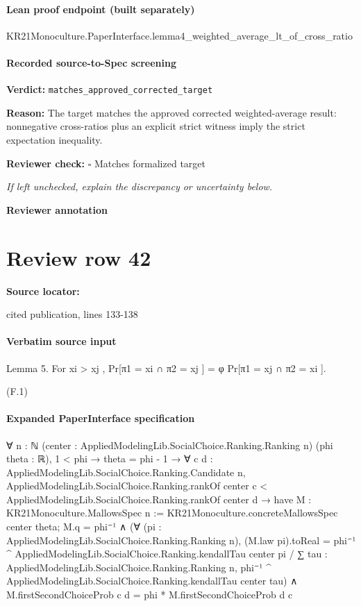 \documentclass[10pt]{article}
\newcommand{\reviewerbox}{%
  \par\noindent\fbox{\parbox{0.96\linewidth}{\rule{0pt}{0.38in}}}\par
}
\newcommand{\reviewmatch}[1]{%
  \par\noindent\textbf{Reviewer check:} $\square$\; #1\par
  \noindent\emph{If left unchecked, explain the discrepancy or uncertainty below.}\par
}
\begin{document}
\paragraph{Lean proof endpoint (built separately)}\begin{ReviewVerbatim}
KR21Monoculture.PaperInterface.lemma4_weighted_average_lt_of_cross_ratio
\end{ReviewVerbatim}

\paragraph{Recorded source-to-Spec screening}
\textbf{Verdict:} \texttt{matches\_approved\_corrected\_target}
\\
{\raggedright
\textbf{Reason:} The target matches the approved corrected weighted-\allowbreak{}average result:\allowbreak{} nonnegative cross-\allowbreak{}ratios plus an explicit strict witness imply the strict expectation inequality.\allowbreak{}
\par}
\reviewmatch{Matches formalized target}
\noindent\textbf{Reviewer annotation}\par
\reviewerbox
\clearpage
\hypertarget{source-claim-938117e3246c9b41}{}
\section*{Review row 42}
\textbf{Source locator:} {\footnotesize\raggedright cited publication, lines 133-\allowbreak{}138\par}
\paragraph{Verbatim source input}
\begin{ReviewVerbatim}
Lemma 5. For xi > xj ,
Pr[π1 = xi ∩ π2 = xj ] = φ Pr[π1 = xj ∩ π2 = xi ].

(F.1)
\end{ReviewVerbatim}



\paragraph{Expanded PaperInterface specification}
\begin{ReviewVerbatim}
∀ {n : ℕ} (center : AppliedModelingLib.SocialChoice.Ranking.Ranking n) (phi theta : ℝ),
  1 < phi →
    theta = phi - 1 →
      ∀ {c d : AppliedModelingLib.SocialChoice.Ranking.Candidate n},
        AppliedModelingLib.SocialChoice.Ranking.rankOf center c <
            AppliedModelingLib.SocialChoice.Ranking.rankOf center d →
          have M : KR21Monoculture.MallowsSpec n := KR21Monoculture.concreteMallowsSpec center theta;
          M.q = phi⁻¹ ∧
            (∀ (pi : AppliedModelingLib.SocialChoice.Ranking.Ranking n),
                (M.law pi).toReal =
                  phi⁻¹ ^ AppliedModelingLib.SocialChoice.Ranking.kendallTau center pi /
                    ∑ tau : AppliedModelingLib.SocialChoice.Ranking.Ranking n,
                      phi⁻¹ ^ AppliedModelingLib.SocialChoice.Ranking.kendallTau center tau) ∧
              M.firstSecondChoiceProb c d = phi * M.firstSecondChoiceProb d c
\end{ReviewVerbatim}
\end{document}
